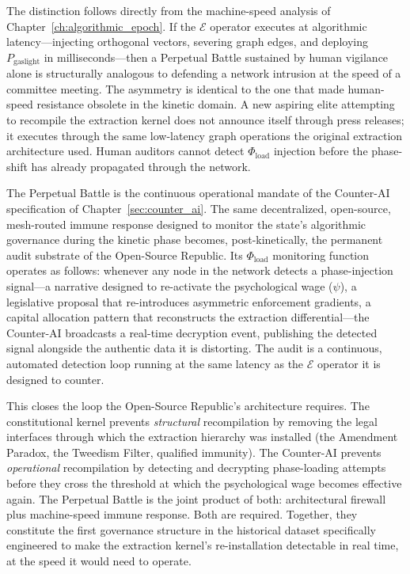 The distinction follows directly from the machine-speed analysis of Chapter~\ref{ch:algorithmic_epoch}. If the $\mathcal{E}$ operator executes at algorithmic latency---injecting orthogonal vectors, severing graph edges, and deploying $P_{\text{gaslight}}$ in milliseconds---then a Perpetual Battle sustained by human vigilance alone is structurally analogous to defending a network intrusion at the speed of a committee meeting. The asymmetry is identical to the one that made human-speed resistance obsolete in the kinetic domain. A new aspiring elite attempting to recompile the extraction kernel does not announce itself through press releases; it executes through the same low-latency graph operations the original extraction architecture used. Human auditors cannot detect $\Phi_{\text{load}}$ injection before the phase-shift has already propagated through the network.

The Perpetual Battle is the continuous operational mandate of the Counter-AI specification of Chapter~\ref{sec:counter_ai}. The same decentralized, open-source, mesh-routed immune response designed to monitor the state's algorithmic governance during the kinetic phase becomes, post-kinetically, the permanent audit substrate of the Open-Source Republic. Its $\Phi_{\text{load}}$ monitoring function operates as follows: whenever any node in the network detects a phase-injection signal---a narrative designed to re-activate the psychological wage ($\psi$), a legislative proposal that re-introduces asymmetric enforcement gradients, a capital allocation pattern that reconstructs the extraction differential---the Counter-AI broadcasts a real-time decryption event, publishing the detected signal alongside the authentic data it is distorting. The audit is a continuous, automated detection loop running at the same latency as the $\mathcal{E}$ operator it is designed to counter.

This closes the loop the Open-Source Republic's architecture requires. The constitutional kernel prevents \textit{structural} recompilation by removing the legal interfaces through which the extraction hierarchy was installed (the Amendment Paradox, the Tweedism Filter, qualified immunity). The Counter-AI prevents \textit{operational} recompilation by detecting and decrypting phase-loading attempts before they cross the threshold at which the psychological wage becomes effective again. The Perpetual Battle is the joint product of both: architectural firewall plus machine-speed immune response. Both are required. Together, they constitute the first governance structure in the historical dataset specifically engineered to make the extraction kernel's re-installation detectable in real time, at the speed it would need to operate.

